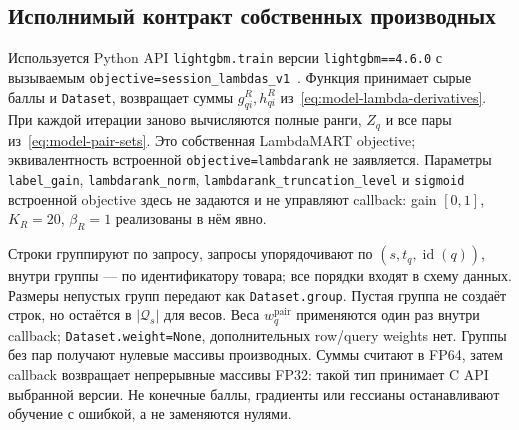 \documentclass[12pt,a4paper]{article}
\newcommand{\code}[1]{{\ttfamily\small\nolinkurl{#1}}}
\theoremstyle{plainru}
\begin{document}
\subsection{Исполнимый контракт собственных производных}
\label{sec:model-ranker-implementation}

Используется Python API \code{lightgbm.train} версии
\code{lightgbm==4.6.0} с вызываемым
\code{objective=session\_lambdas\_v1}~\cite{lightgbm}.
Функция принимает сырые баллы и \code{Dataset}, возвращает
суммы $g_{qi}^R,h_{qi}^R$ из~\eqref{eq:model-lambda-derivatives}.
При каждой итерации заново вычисляются полные ранги, $Z_q$
и все пары из~\eqref{eq:model-pair-sets}.
Это собственная LambdaMART objective; эквивалентность встроенной
\code{objective=lambdarank} не заявляется. Параметры
\code{label\_gain}, \code{lambdarank\_norm},
\code{lambdarank\_truncation\_level} и \code{sigmoid}
встроенной objective здесь не задаются и не управляют callback:
gain $[0,1]$, $K_R=20$, $\beta_R=1$ реализованы в нём явно.

Строки группируют по запросу, запросы упорядочивают по
$(s,t_q,\operatorname{id}(q))$, внутри группы --- по идентификатору
товара; все порядки входят в схему данных. Размеры непустых групп
передают как \code{Dataset.group}. Пустая группа не создаёт строк,
но остаётся в $|\mathcal Q_s|$ для весов. Веса
$w_q^{\mathrm{pair}}$ применяются один раз внутри callback;
\code{Dataset.weight=None}, дополнительных row/query weights нет.
Группы без пар получают нулевые массивы производных.
Суммы считают в FP64, затем callback возвращает непрерывные массивы
FP32: такой тип принимает C API выбранной версии. Не конечные
баллы, градиенты или гессианы останавливают обучение с ошибкой,
а не заменяются нулями.
\end{document}
